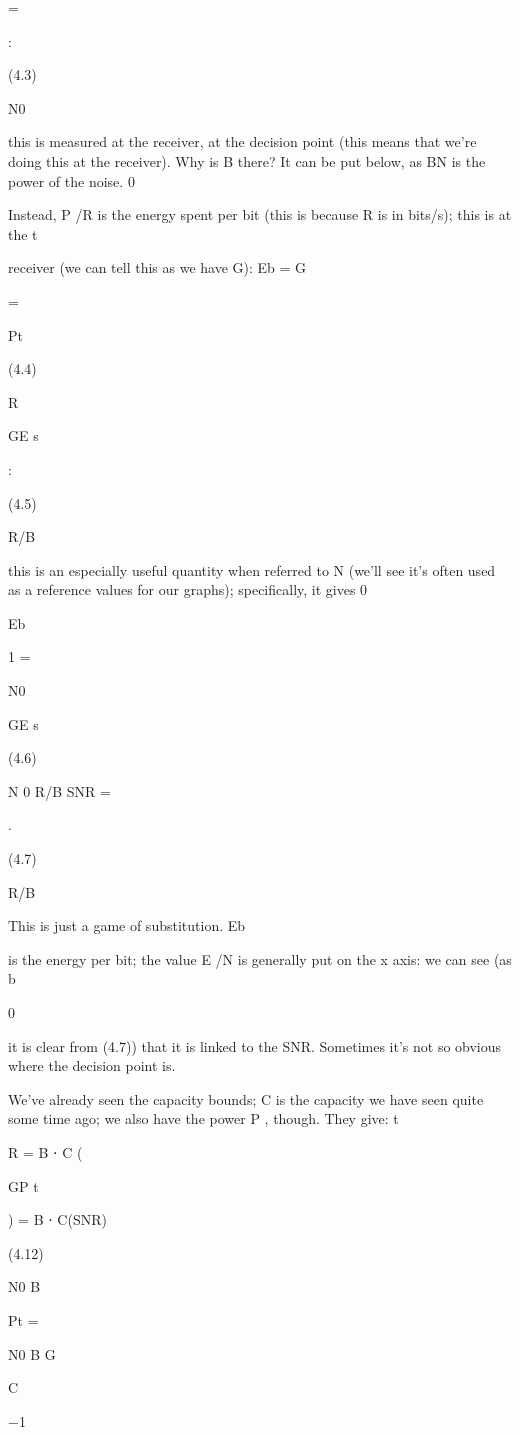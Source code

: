 {{{{{=

:

(4.3)

N0

this is measured at the receiver, at the decision point (this means that we're doing this at the receiver). Why is B there? It can be put below, as BN is the power of the noise.
0

Instead, P /R is the energy spent per bit (this is because R is in bits/s); this is at the t

receiver (we can tell this as we have G):
Eb = G

=

Pt

(4.4)

R

GE s

:

(4.5)

R/B

this is an especially useful quantity when referred to N (we'll see it's often used as a reference values for our graphs); specifically, it gives 0

Eb

1
=

N0

GE s

(4.6)

N 0 R/B SNR
=

.

(4.7)

R/B

This is just a game of substitution.
Eb

is the energy per bit; the value E /N is generally put on the x axis: we can see (as b

0

it is clear from (4.7)) that it is linked to the SNR.
Sometimes it's not so obvious where the decision point is.

We've already seen the capacity bounds; C is the capacity we have seen quite some time ago; we also have the power P , though. They give:
t

R = B ⋅ C (

GP t

) = B ⋅ C(SNR)

(4.12)

N0 B

Pt =

N0 B G

C

−1

}}}}}
